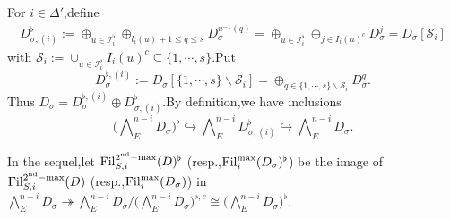 \documentclass[10pt]{article}
\newcommand{\fil}{{\rm Fil}}
\newcommand{\homo}{{\rm Hom}}
\newcommand{\cS}{\mathcal S}
\newcommand{\cI}{\mathcal I}
\begin{document}
For $i\in \Delta'$,\;define 
\begin{equation}
	\begin{aligned}
		D_{\sigma,(i)}^{\flat}:=\oplus_{u\in \cI_{i}^{\flat}}\oplus_{l_i(u)+1\leq q\leq s}D_{\sigma}^{u^{-1}(q)}=\oplus_{u\in \cI_{i}^{\flat}}\oplus_{j\in I_i(u)^c}D_{\sigma}^{j}=D_{\sigma}[\cS_i]
	\end{aligned}
\end{equation}
with $\cS_i:=\cup_{u\in \cI_{i}^{\flat}}I_i(u)^c\subseteq\{1,\cdots,s\}$.\;Put 
\[D_{\sigma}^{\flat,(i)}:=D_{\sigma}[\{1,\cdots,s\}\backslash\cS_i]=\oplus_{q\in \{1,\cdots,s\}\backslash\cS_i}D_{\sigma}^q.\]
Thus $D_{\sigma}=D_{\sigma}^{\flat,(i)}\oplus D^{\flat}_{\sigma,(i)}$.\;By definition,\;we have inclusions
\[\big(\bigwedge\nolimits_{E}^{\!n-i}\!D_{\sigma}\big)^{\flat}\hookrightarrow\bigwedge\nolimits_E^{\!n-i}\!D_{\sigma,(i)}^{\flat}\hookrightarrow \bigwedge\nolimits_E^{\!n-i}\!D_{\sigma}.\]


In the sequel,\;let $\fil_{S,i}^{2^{\mathrm{nd}}-\max}(D)^{\flat}$  (resp.,\;$\fil_i^{\max}(D_{\sigma})^{\flat}$)
be the image of $\fil_{S,i}^{2^{\mathrm{nd}}-\max}(D)$ (resp.,\;$\fil_i^{\max}(D_{\sigma})$) in $ \bigwedge_E^{n-i}D_{\sigma}\twoheadrightarrow \bigwedge_E^{n-i}D_{\sigma}/\big(\bigwedge_{E}^{\!n-i}\!D_{\sigma}\big)^{\flat,c}\cong \big(\bigwedge_{E}^{\!n-i}\!D_{\sigma}\big)^{\flat}$.\;
\end{document}
